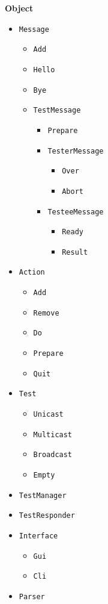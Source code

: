 \documentclass[a4paper,11pt]{article}
\newcommand{\cd}[1]{\texttt{#1}}
\begin{document}
\textbf{Object}
\begin{itemize}
\item \cd{Message} 
	\begin{itemize}
	\item \cd{Add}
	\item \cd{Hello}
	\item \cd{Bye}
	\item \cd{TestMessage}
	\begin{itemize}
		\item \cd{Prepare}
		\item \cd{TesterMessage}
			\begin{itemize}
			\item \cd{Over}
			\item \cd{Abort}
			\end{itemize}
		\item \cd{TesteeMessage}
			\begin{itemize}
			\item \cd{Ready}
			\item \cd{Result}
			\end{itemize}
		\end{itemize}
	\end{itemize}

\item \cd{Action} 
	\begin{itemize}
	\item \cd{Add}
	\item \cd{Remove}
	\item \cd{Do}
	\item \cd{Prepare}
	\item \cd{Quit}
	\end{itemize}

\item \cd{Test}
	\begin{itemize}
	\item \cd{Unicast}
	\item \cd{Multicast}
	\item \cd{Broadcast}
	\item \cd{Empty}
	\end{itemize}

\item \cd{TestManager}
\item \cd{TestResponder}

\item \cd{Interface}
	\begin{itemize}
	\item \cd{Gui}
	\item \cd{Cli}
	\end{itemize}
\item \cd{Parser}


\end{itemize}
\end{document}
